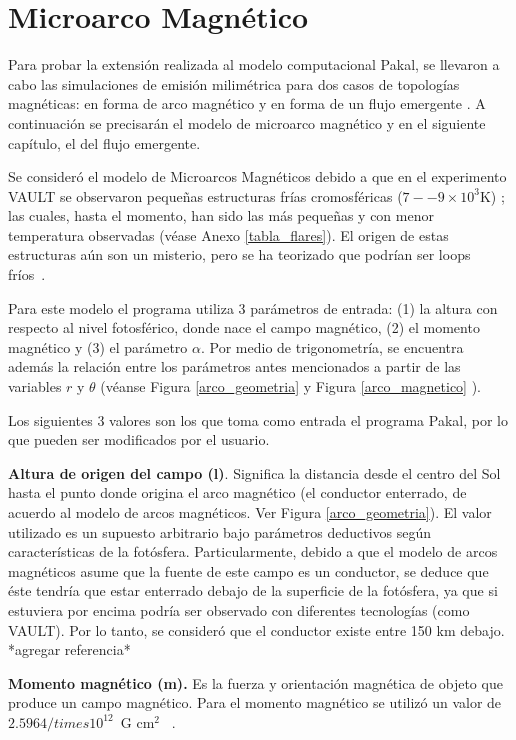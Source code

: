 \chapter{Microarco Magn\'etico} 


Para probar la extensi\'on realizada al modelo computacional Pakal, se llevaron a cabo las simulaciones de emisi\'on milim\'etrica para dos casos de topolog\'ias magn\'eticas: en forma de arco magn\'etico \citep{ashwanden} y en forma de un flujo emergente \citep{flujoemergente}. A continuaci\'on se precisar\'an el modelo de microarco magn\'etico y en el siguiente cap\'itulo, el del flujo emergente.

Se consider\'o el modelo de Microarcos Magn\'eticos debido a que en el experimento VAULT se observaron peque\~nas estructuras fr\'ias cromosf\'ericas ($7--9\times 10^3$K) \citep{VAULT1}; las cuales, hasta el momento, han sido las m\'as peque\~nas y con menor temperatura observadas (v\'ease Anexo \ref{tabla_flares}). El origen de estas estructuras a\'un son un misterio, pero se ha teorizado que podr\'ian ser loops fr\'ios~\citep{VAULT1}.

Para este modelo el programa utiliza 3 par\'ametros de entrada: (1) la altura con respecto al nivel fotosf\'erico, donde nace el campo magn\'etico, (2) el momento magn\'etico y (3) el par\'ametro $\alpha$. Por medio de trigonometr\'ia, se encuentra adem\'as la relaci\'on entre los par\'ametros antes mencionados a partir de las variables $r$ y $\theta$ (v\'eanse Figura \ref{arco_geometria} y Figura \ref{arco_magnetico} ).

Los siguientes 3 valores son los que toma como entrada el programa Pakal, por lo que pueden ser modificados por el usuario.

\textbf{Altura de origen del campo (l)}. Significa la distancia desde el centro del Sol hasta el punto donde origina el arco magn\'etico (el conductor enterrado, de acuerdo al modelo de arcos magn\'eticos. Ver Figura \ref{arco_geometria}). El valor utilizado es un supuesto arbitrario bajo par\'ametros deductivos seg\'un caracter\'isticas de la fot\'osfera. Particularmente, debido a que el modelo de arcos magn\'eticos asume que la fuente de este campo es un conductor, se deduce que \'este tendr\'ia que estar enterrado debajo de la superficie de la fot\'osfera, ya que si estuviera por encima podr\'ia ser observado con diferentes tecnolog\'ias (como VAULT). Por lo tanto, se consider\'o que el conductor existe entre 150 km debajo.
*agregar referencia*

\textbf{Momento magn\'etico (m).} Es la fuerza y orientaci\'on magn\'etica de  objeto que produce un campo magn\'etico. Para el momento magn\'etico se utiliz\'o un valor de $2.5964 /times 10^{12}$~G cm$^2$ ~\citep{mariska}.


